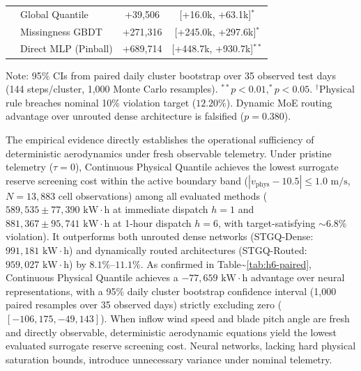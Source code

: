 \documentclass[
  journal]{IEEEtran}
\begin{document}
\begin{table}[!htbp]
\begin{tabular*}{\columnwidth}{@{\extracolsep{\fill}}llcc@{}}
 & Global Quantile & +39,506 & [+16.0k, +63.1k]$^{\ast}$ \\
 & Missingness GBDT & +271,316 & [+245.0k, +297.6k]$^{\ast}$ \\
 & Direct MLP (Pinball) & +689,714 & [+448.7k, +930.7k]$^{\ast\ast}$ \\
\bottomrule
\end{tabular*}
\vspace{1mm}
\raggedright\fontsize{8.0pt}{8.8pt}\selectfont Note: 95\% CIs from paired daily cluster bootstrap over 35 observed test days (144 steps/cluster, 1,000 Monte Carlo resamples). $^{\ast\ast}p<0.01, ^{\ast}p<0.05$. $^{\dagger}$Physical rule breaches nominal 10\% violation target ($12.20\%$). Dynamic MoE routing advantage over unrouted dense architecture is falsified ($p=0.380$).
\end{table}

The empirical evidence directly establishes the operational sufficiency
of deterministic aerodynamics under fresh observable telemetry. Under
pristine telemetry (\(\tau = 0\)), Continuous Physical Quantile achieves
the lowest surrogate reserve screening cost within the active boundary
band (\(|v_{\text{phys}}-10.5|\le 1.0\text{ m/s}\), \(N=13{,}883\) cell
observations) among all evaluated methods
(\(589{,}535 \pm 77{,}390\text{ kW}\cdot\text{h}\) at immediate dispatch
\(h=1\) and \(881{,}367 \pm 95{,}741\text{ kW}\cdot\text{h}\) at 1-hour
dispatch \(h=6\), with target-satisfying \(\sim 6.8\%\) violation). It
outperforms both unrouted dense networks (STGQ-Dense:
\(991{,}181\text{ kW}\cdot\text{h}\)) and dynamically routed
architectures (STGQ-Routed: \(959{,}027\text{ kW}\cdot\text{h}\)) by
\(8.1\%\text{--}11.1\%\). As confirmed in
Table\textasciitilde{}\ref{tab:h6-paired}, Continuous Physical Quantile
achieves a \(-77{,}659\text{ kW}\cdot\text{h}\) advantage over neural
representations, with a 95\% daily cluster bootstrap confidence interval
(1,000 paired resamples over 35 observed days) strictly excluding zero
(\([-106{,}175, -49{,}143]\)). When inflow wind speed and blade pitch
angle are fresh and directly observable, deterministic aerodynamic
equations yield the lowest evaluated surrogate reserve screening cost.
Neural networks, lacking hard physical saturation bounds, introduce
unnecessary variance under nominal telemetry.
\end{document}
